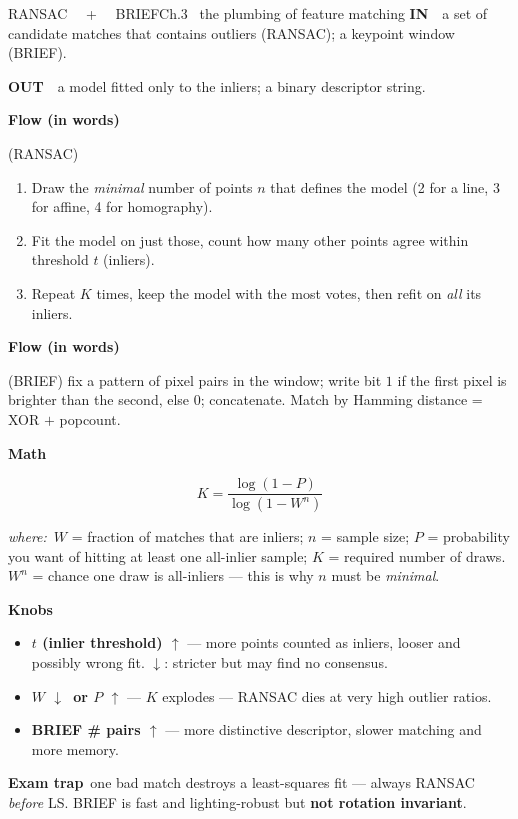 \documentclass[9pt,a4paper]{extarticle}
\newcommand{\IN}{\textbf{\color{cIn}IN}\ }
\newcommand{\OUT}{\par\textbf{\color{cOut}OUT}\ }
\newcommand{\FLOW}{\par\smallskip\textbf{Flow (in words)}\par\nopagebreak}
\newcommand{\MATH}{\par\smallskip\textbf{Math}\par\nopagebreak}
\newcommand{\KNOBS}{\par\smallskip\textbf{Knobs}\par\nopagebreak}
\newcommand{\TRAP}{\par\smallskip\textbf{\color{cTrap}Exam trap}\ }
\newcommand{\WHERE}{\par\textit{where:}\ }
\newcommand{\up}{$\uparrow$}
\newcommand{\dn}{$\downarrow$}
\newcommand{\kn}[2]{\item \textbf{#1} --- #2}
\begin{document}
\begin{card}{RANSAC \ \ + \ \ BRIEF}{Ch.3 \textbullet\ the plumbing of feature matching}
\IN\ a set of candidate matches that contains outliers (RANSAC); a keypoint window (BRIEF).
\OUT\ a model fitted only to the inliers; a binary descriptor string.

\FLOW (RANSAC)
\begin{enumerate}
  \item Draw the \emph{minimal} number of points $n$ that defines the model (2 for a line, 3 for affine, 4 for homography).
  \item Fit the model on just those, count how many other points agree within threshold $t$ (inliers).
  \item Repeat $K$ times, keep the model with the most votes, then refit on \emph{all} its inliers.
\end{enumerate}
\FLOW (BRIEF) fix a pattern of pixel pairs in the window; write bit $1$ if the first pixel is brighter than the second, else $0$; concatenate. Match by Hamming distance = XOR $+$ popcount.

\MATH
\[ K=\frac{\log(1-P)}{\log(1-W^n)} \]
\WHERE $W$ = fraction of matches that are inliers; $n$ = sample size; $P$ = probability you want of hitting at least one all-inlier sample; $K$ = required number of draws. $W^n$ = chance one draw is all-inliers --- this is why $n$ must be \emph{minimal}.

\KNOBS
\begin{itemize}
  \kn{$t$ (inlier threshold) \up}{more points counted as inliers, looser and possibly wrong fit. \dn: stricter but may find no consensus.}
  \kn{$W$ \dn\ or $P$ \up}{$K$ explodes --- RANSAC dies at very high outlier ratios.}
  \kn{BRIEF \# pairs \up}{more distinctive descriptor, slower matching and more memory.}
\end{itemize}
\TRAP one bad match destroys a least-squares fit --- always RANSAC \emph{before} LS. BRIEF is fast and lighting-robust but \textbf{not rotation invariant}.
\end{card}
\end{document}
